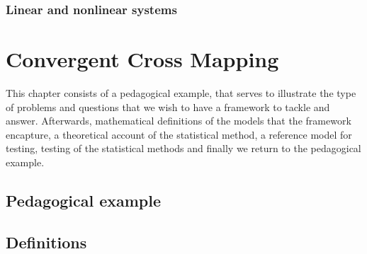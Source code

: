 \documentclass[11pt, a4paper]{memoir}
\begin{document}
\subsection{Linear and nonlinear systems}


\chapter{Convergent Cross Mapping}
This chapter consists of a pedagogical example, that serves to illustrate the type of problems and questions that we wish to have a framework to tackle and answer. Afterwards, mathematical definitions of the models that the framework encapture, a theoretical account of the statistical method, a reference model for testing, testing of the statistical methods and finally we return to the pedagogical example.
\section{Pedagogical example}

\section{Definitions}
\end{document}
